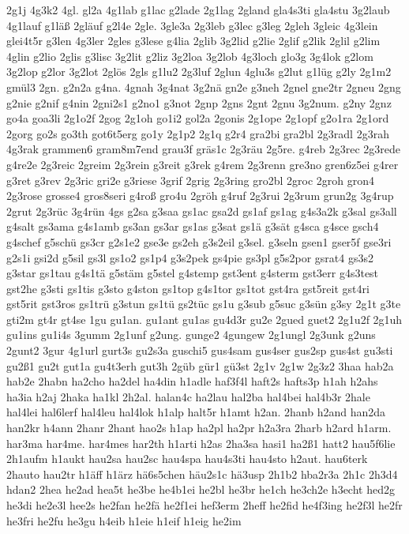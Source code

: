 {2g1j
4g3k2
4gl.
gl2a
4g1lab
g1lac
g2lade
2g1lag
2gland
gla4s3ti
gla4stu
3g2laub
4g1lauf
g1läß
2gläuf
g2l4e
2gle.
3gle3a
2g3leb
g3lec
g3leg
2gleh
3gleic
4g3lein
glei4t5r
g3len
4g3ler
2gles
g3lese
g4lia
2glib
3g2lid
g2lie
2glif
g2lik
2glil
g2lim
4glin
g2lio
2glis
g3lisc
3g2lit
g2liz
3g2loa
3g2lob
4g3loch
glo3g
3g4lok
g2lom
3g2lop
g2lor
3g2lot
2glös
2gls
g1lu2
2g3luf
2glun
4glu3s
g2lut
g1lüg
g2ly
2g1m2
gmül3
2gn.
g2n2a
g4na.
4gnah
3g4nat
3g2nä
gn2e
g3neh
2gnel
gne2tr
2gneu
2gng
g2nie
g2nif
g4nin
2gni2s1
g2no1
g3not
2gnp
2gns
2gnt
2gnu
3g2num.
g2ny
2gnz
go4a
goa3li
2g1o2f
2gog
2g1oh
go1i2
gol2a
2gonis
2g1ope
2g1opf
g2o1ra
2g1ord
2gorg
go2s
go3th
got6t5erg
go1y
2g1p2
2g1q
g2r4
gra2bi
gra2bl
2g3radl
2g3rah
4g3rak
grammen6
gram8m7end
grau3f
gräs1c
2g3räu
2g5re.
g4reb
2g3rec
2g3rede
g4re2e
2g3reic
2greim
2g3rein
g3reit
g3rek
g4rem
2g3renn
gre3no
gren6z5ei
g4rer
g3ret
g3rev
2g3ric
gri2e
g3riese
3grif
2grig
2g3ring
gro2bl
2groc
2groh
gron4
2g3rose
grosse4
gros8seri
g4roß
gro4u
2gröh
g4ruf
2g3rui
2g3rum
grun2g
3g4rup
2grut
2g3rüc
3g4rün
4gs
g2sa
g3saa
gs1ac
gsa2d
gs1af
gs1ag
g4s3a2k
g3sal
gs3all
g4salt
gs3ama
g4s1amb
gs3an
gs3ar
gs1as
g3sat
gs1ä
g3sät
g4sca
g4sce
gsch4
g4schef
g5schü
gs3cr
g2s1e2
gse3e
gs2eh
g3s2eil
g3sel.
g3seln
gsen1
gser5f
gse3ri
g2s1i
gsi2d
g5sil
gs3l
gs1o2
gs1p4
g3s2pek
gs4pie
gs3pl
g5s2por
gsrat4
gs3s2
g3star
gs1tau
g4s1tä
g5stäm
g5stel
g4stemp
gst3ent
g4sterm
gst3err
g4s3test
gst2he
g3sti
gs1tis
g3sto
g4ston
gs1top
g4s1tor
gs1tot
gst4ra
gst5reit
gst4ri
gst5rit
gst3ros
gs1trü
g3stun
gs1tü
gs2tüc
gs1u
g3sub
g5suc
g3sün
g3sy
2g1t
g3te
gti2m
gt4r
gt4se
1gu
gu1an.
gu1ant
gu1as
gu4d3r
gu2e
2gued
guet2
2g1u2f
2g1uh
gu1ins
gu1i4s
3gumm
2g1unf
g2ung.
gunge2
4gungew
2g1ungl
2g3unk
g2uns
2gunt2
3gur
4g1url
gurt3s
gu2s3a
guschi5
gus4sam
gus4ser
gus2sp
gus4st
gu3sti
gu2ß1
gu2t
gut1a
gu4t3erh
gut3h
2güb
gür1
gü3st
2g1v
2g1w
2g3z2
3haa
hab2a
hab2e
2habn
ha2cho
ha2del
ha4din
h1adle
haf3f4l
haft2s
hafts3p
h1ah
h2ahs
ha3ia
h2aj
2haka
ha1kl
2h2al.
halan4c
ha2lau
hal2ba
hal4bei
hal4b3r
2hale
hal4lei
hal6lerf
hal4leu
hal4lok
h1alp
halt5r
h1amt
h2an.
2hanb
h2and
han2da
han2kr
h4ann
2hanr
2hant
hao2s
h1ap
ha2pl
ha2pr
h2a3ra
2harb
h2ard
h1arm.
har3ma
har4me.
har4mes
har2th
h1arti
h2as
2ha3sa
hasi1
ha2ß1
hatt2
hau5f6lie
2h1aufm
h1aukt
hau2sa
hau2sc
hau4spa
hau4s3ti
hau4sto
h2aut.
hau6terk
2hauto
hau2tr
h1äff
h1ärz
hä6s5chen
häu2s1c
hä3usp
2h1b2
hba2r3a
2h1c
2h3d4
hdan2
2hea
he2ad
hea5t
he3be
he4b1ei
he2bl
he3br
he1ch
he3ch2e
h3echt
hed2g
he3di
he2e3l
hee2s
he2fan
he2fä
he2f1ei
hef3erm
2heff
he2fid
he4f3ing
he2f3l
he2fr
he3fri
he2fu
he3gu
h4eib
h1eie
h1eif
h1eig
he2im
}
